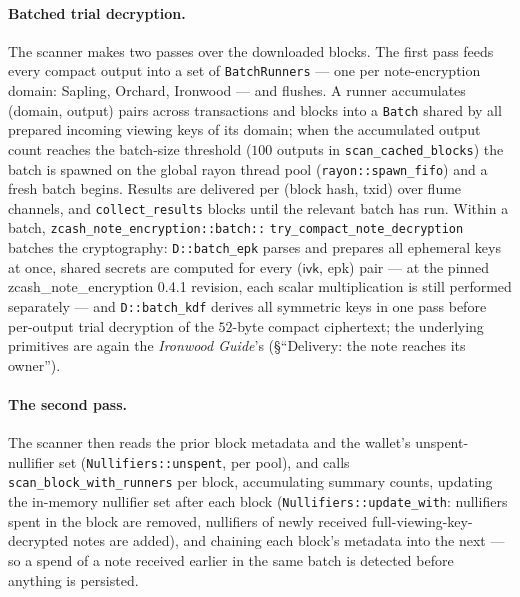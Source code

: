\documentclass[11pt,a4paper]{article}
\theoremstyle{definition}
\newcommand{\ivk}{\ensuremath{\mathsf{ivk}}}
\begin{document}
\paragraph{Batched trial decryption.} The scanner makes two passes over the
downloaded blocks. The first pass feeds every compact output into a set of
\texttt{BatchRunners} --- one per note-encryption domain: Sapling, Orchard,
Ironwood --- and flushes. A runner accumulates (domain, output) pairs
across transactions and blocks into a \texttt{Batch} shared by all prepared
incoming viewing keys of its domain; when the accumulated output count
reaches the batch-size threshold ($100$ outputs in
\texttt{scan\_cached\_blocks}) the batch is spawned on the global
\textsf{rayon} thread pool (\texttt{rayon::spawn\_fifo}) and a fresh batch
begins. Results are delivered per (block hash, txid) over \textsf{flume}
channels, and \texttt{collect\_results} blocks until the relevant batch has
run. Within a batch,
\texttt{zcash\_note\_encryption::}\allowbreak\texttt{batch::}\allowbreak
\texttt{try\_compact\_note\_\allowbreak decryption}
batches the cryptography: \texttt{D::batch\_epk} parses and prepares all
ephemeral keys at once, shared secrets are computed for every
(\ivk, \textsf{epk}) pair --- at the pinned \textsf{zcash\_note\_encryption}
0.4.1 revision, each scalar multiplication is still performed separately ---
and \texttt{D::batch\_kdf} derives all symmetric keys in one
pass before per-output trial decryption of the $52$-byte compact ciphertext; the
underlying primitives are again the \emph{Ironwood Guide}'s
(\S``Delivery: the note reaches its owner'').

\paragraph{The second pass.} The scanner then reads the prior block
metadata and the wallet's unspent-nullifier set
(\texttt{Nullifiers::unspent}, per pool), and calls
\texttt{scan\_block\_with\_runners} per block, accumulating summary counts,
updating the in-memory nullifier set after each block
(\texttt{Nullifiers::update\_with}: nullifiers spent in the block are
removed, nullifiers of newly received full-viewing-key-decrypted notes are
added), and chaining each block's metadata into the next --- so a spend of
a note received earlier in the same batch is detected before anything is
persisted.
\end{document}
